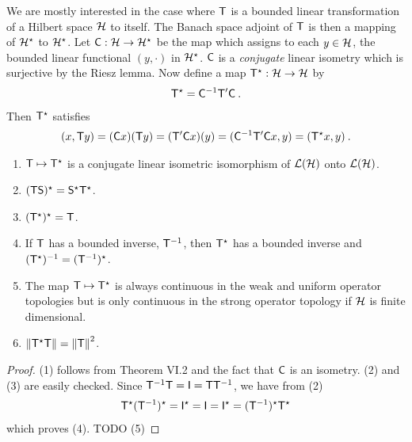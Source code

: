 We are mostly interested in the case where $\mathsf{T}$ is a bounded linear transformation of a Hilbert space $\mathcal{H}$ to itself. The Banach space adjoint of $\mathsf{T}$ is then a mapping of $\mathcal{H}^\star$ to $\mathcal{H}^\star$. Let $\mathsf{C} : \mathcal{H} \to \mathcal{H}^\star$ be the map which assigns to each $y \in \mathcal{H}$, the bounded linear functional $(y, \cdot)$ in $\mathcal{H}^\star$. $\mathsf{C}$ is a \textit{conjugate} linear isometry which is surjective by the Riesz lemma. Now define a map $\mathsf{T}^\star : \mathcal{H} \to \mathcal{H}$ by \begin{align}
    \mathsf{T}^\star = \mathsf{C}^{-1} \mathsf{T}' \mathsf{C} \:.
\end{align}
Then $\mathsf{T}^\star$ satisfies \begin{align}
    (x, \mathsf{T} y) = (\mathsf{C} x)(\mathsf{T} y)= (\mathsf{T}' \mathsf{C} x)(y) = (\mathsf{C}^{-1} \mathsf{T}' \mathsf{C} x, y) = (\mathsf{T}^\star x,y) \:.
\end{align}

\begin{theorem}
    \begin{enumerate}
        \item $\mathsf{T} \mapsto \mathsf{T}^\star$ is a conjugate linear isometric isomorphism of $\mathcal L(\mathcal{H})$ onto $\mathcal L(\mathcal{H})$.
        \item $(\mathsf{T} \mathsf{S})^\star = \mathsf{S}^\star \mathsf{T}^\star$.
        \item $(\mathsf{T}^\star)^\star = \mathsf{T}$.
        \item If $\mathsf{T}$ has a bounded inverse, $\mathsf{T}^{-1}$, then $\mathsf{T}^\star$ has a bounded inverse and $(\mathsf{T}^\star)^{-1} = (\mathsf{T}^{-1})^\star$.
        \item The map $\mathsf{T} \mapsto \mathsf{T}^\star$ is always continuous in the weak and uniform operator topologies but is only continuous in the strong operator topology if $\mathcal{H}$ is finite dimensional.
        \item $\left \Vert \mathsf{T}^\star \mathsf{T} \right \Vert = \left \Vert \mathsf{T} \right \Vert^2$.
    \end{enumerate}
\end{theorem}

\begin{proof}
    (1) follows from Theorem VI.2 and the fact that $\mathsf{C}$ is an isometry. (2) and (3) are easily checked. Since $\mathsf{T}^{-1} \mathsf{T} = \mathsf{I} = \mathsf{T} \mathsf{T}^{-1}$, we have from (2)
    \begin{align}
        \mathsf{T}^\star (\mathsf{T}^{-1})^\star = \mathsf{I}^\star = \mathsf{I} = \mathsf{I}^\star = (\mathsf{T}^{-1})^\star \mathsf{T}^\star
    \end{align}
    which proves (4).
    TODO (5)
\end{proof}

